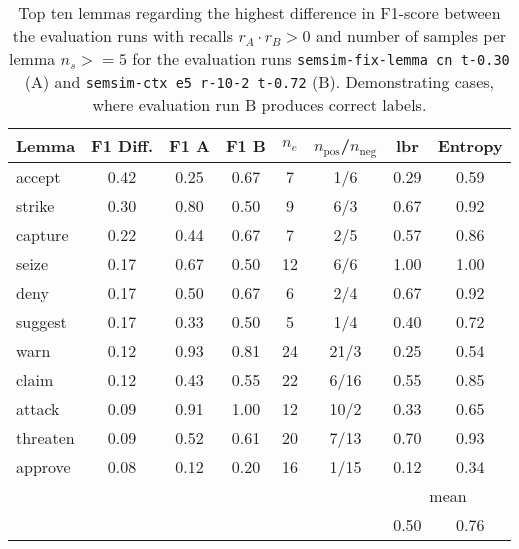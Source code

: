 \documentclass[11pt, numbers=noenddot]{scrreprt}
\begin{document}
\begin{table}[p]
\centering
\begin{tabular}{lccccccc}
\toprule
Lemma      & F1 Diff. & F1 A & F1 B & \(n_e\) & \(n_\text{pos}\)/\(n_\text{neg}\) & \gls{lbr} & Entropy \\
\midrule
accept     & 0.42      & 0.25           & 0.67           & 7               & 1/6     & 0.29 & 0.59 \\
strike     & 0.30      & 0.80           & 0.50           & 9               & 6/3     & 0.67 & 0.92 \\
capture    & 0.22      & 0.44           & 0.67           & 7               & 2/5     & 0.57 & 0.86 \\
seize      & 0.17      & 0.67           & 0.50           & 12              & 6/6     & 1.00 & 1.00 \\
deny       & 0.17      & 0.50           & 0.67           & 6               & 2/4     & 0.67 & 0.92 \\
suggest    & 0.17      & 0.33           & 0.50           & 5               & 1/4     & 0.40 & 0.72 \\
warn       & 0.12      & 0.93           & 0.81           & 24              & 21/3    & 0.25 & 0.54 \\
claim      & 0.12      & 0.43           & 0.55           & 22              & 6/16    & 0.55 & 0.85 \\
attack     & 0.09      & 0.91           & 1.00           & 12              & 10/2    & 0.33 & 0.65 \\
threaten   & 0.09      & 0.52           & 0.61           & 20              & 7/13    & 0.70 & 0.93 \\
approve    & 0.08      & 0.12           & 0.20           & 16              & 1/15    & 0.12 & 0.34 \\
\cmidrule{7-8}
\multicolumn{6}{l}{} & \multicolumn{2}{c}{mean} \\
\multicolumn{6}{l}{} & 0.50 & 0.76 \\
\bottomrule
\end{tabular}
\caption{Top ten lemmas regarding the highest difference in F1-score between the evaluation runs with recalls \(r_A \cdot r_B > 0\) and number of samples per lemma \(n_s >= 5\) for the evaluation runs \texttt{semsim-fix-lemma cn t-0.30} (A) and \texttt{semsim-ctx e5 r-10-2 t-0.72} (B). Demonstrating cases, where evaluation run B produces correct labels.}
\label{tab:predicate-lemma-highest-f1-both-recall-non-zero}
\end{table}
\end{document}
